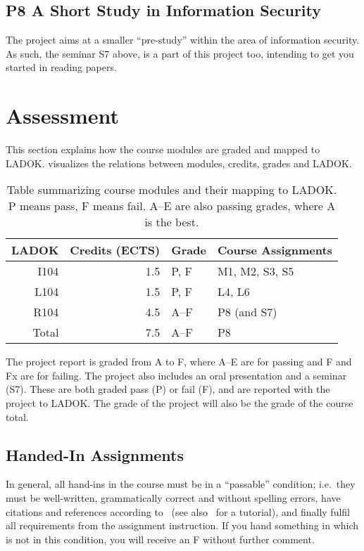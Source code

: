 \subsection{P8 A Short Study in Information Security}

The project aims at a smaller \enquote{pre-study} within the area of 
information security.
As such, the seminar S7 above, is a part of this project too, intending to get 
you started in reading papers.


\section{Assessment}
\label{Assessment}

This section explains how the course modules are graded and mapped to LADOK\@.
 visualizes the relations between modules, credits, grades and 
LADOK\@.

\begin{table}
  \centering
  \caption{%
    Table summarizing course modules and their mapping to LADOK\@.
    P means pass, F means fail.
    A--E are also passing grades, where A is the best.
  }\label{LADOKTable}
  \begin{tabular}{rrll}
    \toprule
    LADOK & Credits (ECTS)  & Grade       & Course Assignments\\
    \midrule
    I104  & 1.5             & P, F        & M1, M2, S3, S5\\
    L104  & 1.5             & P, F        & L4, L6\\
    R104  & 4.5             & A--F        & P8 (and S7)\\
    \midrule
    Total & 7.5             & A--F        & P8\\
    \bottomrule
  \end{tabular}
\end{table}

The project report is graded from A to F, where A--E are for passing and F and 
Fx are for failing.
The project also includes an oral presentation and a seminar (S7).
These are both graded pass (P) or fail (F), and are reported with the project 
to LADOK\@.
The grade of the project will also be the grade of the course total.

\subsection{Handed-In Assignments}

In general, all hand-ins in the course must be in a \enquote{passable} 
condition; i.e.~they must be well-written, grammatically correct and without 
spelling errors, have citations and references according to~\cite{IEEEcitation} 
(see also~\cite{PurdueCitation} for a tutorial), and finally fulfil all 
requirements from the assignment instruction.
If you hand something in which is not in this condition, you will receive an 
F without further comment.

